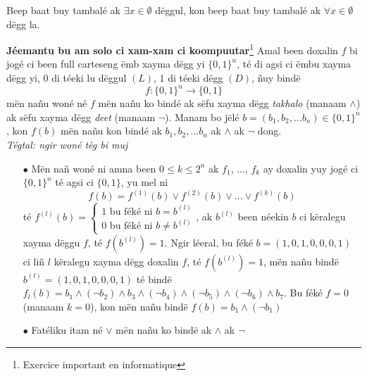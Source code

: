 \documentclass[twoside, a4paper]{article}
\begin{document}
\begin{tcolorbox}[enhanced jigsaw,breakable,pad at break*=1mm, colback=orange!5!white,colframe=white!75!black,title= Waxanté\footnote{Convention},
    watermark color=white]
  Beep baat buy tambalé ak $\exists x \in \emptyset$ dëggul, kon beep baat buy tambalé ak $\forall x \in \emptyset$ dëgg la.
\end{tcolorbox}

\textbf{Jéemantu bu am solo ci xam-xam ci koompuutar}\footnote{Exercice important en informatique}
Amal been doxalin $f$ bi jogé ci been full carteseng ëmb xayma dëgg yi $\{0,1\}^n$, té di agsi ci ëmbu xayma dëgg yi, $0$ di téeki lu dëggul $(L)$,  $1$ di téeki dëgg $(D)$, ñuy bindë
$$f: \{0,1\}^n \rightarrow \{0,1\}$$
mën nañu woné né $f$ mën nañu ko bindé ak sëfu xayma dëgg \textit{takhalo} (manaam $\land$) ak sëfu xayma dëgg \textit{deet} (manaam $\neg$). Manam bo jëlé $b = (b_1,b_2,...b_n) \in \{0,1\}^n$, kon $f(b)$ mën nañu kon bindé ak $b_1,b_2,...b_n$ ak $\land$ ak $\neg$ dong.\\
\textit{Tégtal: ngir woné tèg bi muj}
\begin{itemize}
  \item[$\bullet$] Mën nañ woné ni amna been $0\leq k \leq 2^n$ ak $f_1$, ..., $f_k$ ay doxalin yuy jogé ci $\{0,1\}^n$ té agsi ci $\{0,1\}$, yu mel ni $$f(b) = f^{(1)}(b) \lor f^{(2)}(b) \lor ... \lor f^{(k)}(b)$$ té $f^{(l)}(b) = \left\{\begin{array}{ll}
            1 \text{ bu féké ni $b=b^{(l)}$} \\
            0 \text{ bu féké ni $b\neq b^{(l)}$}
          \end{array}\right.$, ak $b^{(l)}$ been néekin $b$ ci këralegu xayma dëggu $f$, té $f(b^{(l)}) = 1$. Ngir léeral, bu féké $b=(1,0,1,0,0,0,1)$ ci liñ $l$ këralegu xayma dëgg doxalin $f$, té $f(b^{(l)}) = 1$, mën nañu bindë $b^{(l)} = (1,0,1,0,0,0,1)$ té bindë $f_l(b) = b_1 \land (\neg b_2) \land b_3 \land (\neg b_4) \land (\neg b_5) \land (\neg b_6) \land  b_7 $. Bu féké $f = 0$ (manaam $k=0$), kon mën nañu bindë $f(b)=b_1 \land (\neg b_1)$
  \item[$\bullet$] Fatéliku itam né $\lor$ mën nañu ko bindë ak $\land$ ak $\neg$
\end{itemize}
\end{document}
